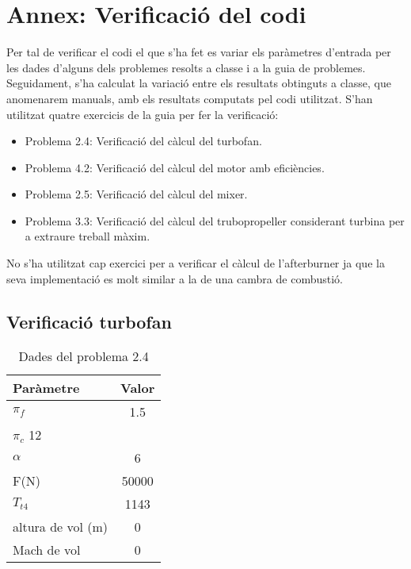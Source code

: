 \section{Annex: Verificació del codi}
\label{anexo}
Per tal de verificar el codi el que s'ha fet es variar els paràmetres d'entrada per les dades d'alguns dels problemes resolts a classe i a la guia de problemes. Seguidament, s'ha calculat la variació entre els resultats obtinguts a classe, que anomenarem manuals, amb els resultats computats pel codi utilitzat. S'han utilitzat quatre exercicis de la guia per fer la verificació:
\begin{itemize}
\item Problema 2.4: Verificació del càlcul del turbofan.
\item Problema 4.2: Verificació del càlcul del motor amb eficiències. 
\item Problema 2.5: Verificació del càlcul del mixer.
\item Problema 3.3: Verificació del càlcul del trubopropeller considerant turbina per a extraure treball màxim.
\end{itemize}
No s'ha utilitzat cap exercici per a verificar el càlcul de l'afterburner ja que la seva implementació es molt similar a la de una cambra de combustió. 
\subsection{Verificació turbofan}

\begin{table}[H]
\centering
\begin{tabular}{lc}
\toprule[3pt]
\textbf{Paràmetre}&\textbf{Valor}\\
\midrule[1pt]
$\pi_f$	&1.5\\

$\pi_c$	12\\

$\alpha	$&6\\

F(N)	&50000\\

$T_{t4}$&1143\\

altura de vol (m)	&0\\

Mach de vol	&0\\



\bottomrule[2pt]
\end{tabular}
\caption{Dades del problema 2.4}
\end{table}

